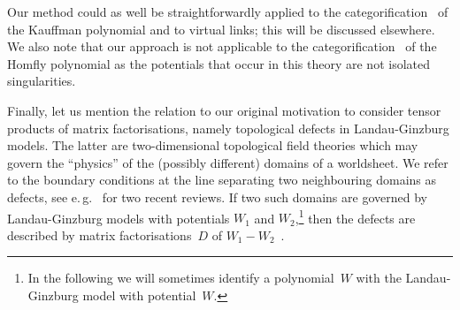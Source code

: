 \documentclass{compositio}
\theoremstyle{definition}
\numberwithin{equation}{section}
\begin{document}
Our method could as well be straightforwardly applied to the categorification~\cite{kr0701333} of the Kauffman polynomial and to virtual links; this will be discussed elsewhere. We also note that our approach is not applicable to the categorification~\cite{kr0505056} of the Homfly polynomial as the potentials that occur in this theory are not isolated singularities. 

\medskip

Finally, let us mention the relation to our original motivation to consider tensor products of matrix factorisations, namely topological defects in Landau-Ginzburg models. The latter are two-dimensional topological field theories which may govern the ``physics'' of the (possibly different) domains of a worldsheet.  We refer to the boundary conditions at the line separating two neighbouring domains as defects, see e.\,g.~\cite{k1004.2307, dkr1107.0495} for two recent reviews. If two such domains are governed by Landau-Ginzburg models with potentials $W_{1}$ and $W_{2}$,\footnote{In the following we will sometimes identify a polynomial~$W$ with the Landau-Ginzburg model with potential~$W$.} then the defects are described by matrix factorisations~$D$ of $W_{1}-W_{2}$~\cite{br0707.0922}. 
\end{document}

